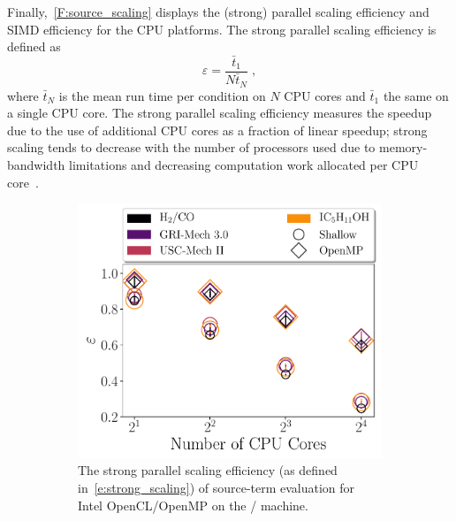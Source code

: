 \documentclass[12pt,number,sort&compress,preprint]{elsarticle}
\begin{document}
Finally,~\cref{F:source_scaling} displays the (strong) parallel scaling efficiency and SIMD efficiency for the CPU platforms.
The strong parallel scaling efficiency is defined as
\begin{equation}
 \label{e:strong_scaling}
 \varepsilon = \frac{\bar{t}_{1}}{N \bar{t}_{N}} \;,
\end{equation}
where $\bar{t}_{N}$ is the mean run time per condition on $N$ CPU cores and $\bar{t}_{1}$ the same on a single CPU core.
The strong parallel scaling efficiency measures the speedup due to the use of additional CPU cores as a fraction of linear speedup; strong scaling tends to decrease with the number of processors used due to memory-bandwidth limitations and decreasing computation work allocated per CPU core~\cite{strong_scaling}.

\begin{figure}[htbp]
   \centering
  \begin{subfigure}[t]{0.48\linewidth}
      \includegraphics[width=\textwidth]{source_parallel_scaling.pdf}
      \caption{The strong parallel scaling efficiency (as defined in~\cref{e:strong_scaling}) of source-term evaluation for Intel OpenCL\slash OpenMP on the \avx/ machine.}
      \label{F:source_parallel_scaling}
  \end{subfigure}
  \hfill
  \begin{subfigure}[t]{0.48\linewidth}

\end{subfigure}
\end{figure}
\end{document}
